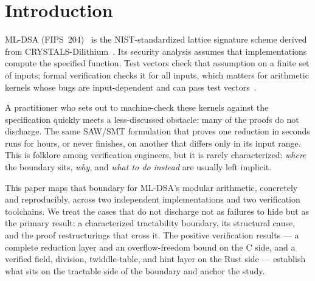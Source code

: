\documentclass[11pt]{article}
\begin{document}
\section{Introduction}\label{sec:intro}

ML-DSA (FIPS~204)~\cite{fips204} is the NIST-standardized lattice signature scheme derived from
CRYSTALS-Dilithium~\cite{dilithium}. Its security analysis assumes that implementations compute the
specified function. Test vectors check that assumption on a finite set of inputs; formal verification
checks it for all inputs, which matters for arithmetic kernels whose bugs are input-dependent and can
pass test vectors~\cite{eprint1032}.

A practitioner who sets out to machine-check these kernels against the specification quickly meets a
less-discussed obstacle: many of the proofs do not discharge. The same SAW/SMT formulation that proves
one reduction in seconds runs for hours, or never finishes, on another that differs only in its input
range. This is folklore among verification engineers, but it is rarely characterized: \emph{where} the
boundary sits, \emph{why}, and \emph{what to do instead} are usually left implicit.

This paper maps that boundary for ML-DSA's modular arithmetic, concretely and reproducibly, across two
independent implementations and two verification toolchains. We treat the cases that do not discharge not
as failures to hide but as the primary result: a characterized tractability boundary, its structural
cause, and the proof restructurings that cross it. The positive verification results --- a complete
reduction layer and an overflow-freedom bound on the C side, and a verified field, division,
twiddle-table, and hint layer on the Rust side --- establish what sits on the tractable side of the
boundary and anchor the study.
\end{document}
